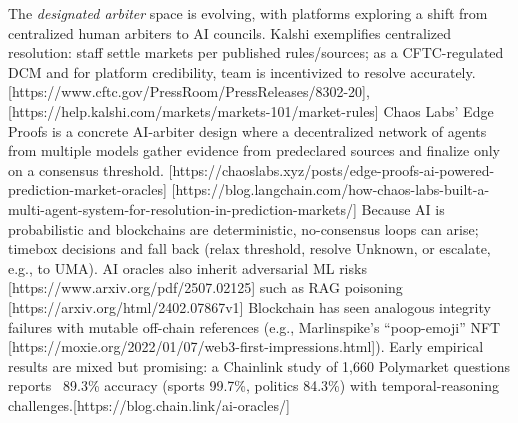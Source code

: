 

The \textit{designated arbiter} space is evolving, with platforms exploring a shift from centralized human arbiters to AI councils. Kalshi exemplifies centralized resolution: staff settle markets per published rules/sources; as a CFTC-regulated DCM and for platform credibility, team is incentivized to resolve accurately.[https://www.cftc.gov/PressRoom/PressReleases/8302-20], [https://help.kalshi.com/markets/markets-101/market-rules]
Chaos Labs’ Edge Proofs is a concrete AI-arbiter design where a decentralized network of agents from multiple models gather evidence from predeclared sources and finalize only on a consensus threshold. [https://chaoslabs.xyz/posts/edge-proofs-ai-powered-prediction-market-oracles] [https://blog.langchain.com/how-chaos-labs-built-a-multi-agent-system-for-resolution-in-prediction-markets/]
Because AI is probabilistic and blockchains are deterministic, no-consensus loops can arise; timebox decisions and fall back (relax threshold, resolve Unknown, or escalate, e.g., to UMA). AI oracles also inherit adversarial ML risks [https://www.arxiv.org/pdf/2507.02125] such as RAG poisoning [https://arxiv.org/html/2402.07867v1] Blockchain has seen analogous integrity failures with mutable off-chain references (e.g., Marlinspike’s “poop-emoji” NFT [https://moxie.org/2022/01/07/web3-first-impressions.html]).
Early empirical results are mixed but promising: a Chainlink study of 1,660 Polymarket questions reports ~89.3\% accuracy (sports 99.7\%, politics 84.3\%) with temporal-reasoning challenges.[https://blog.chain.link/ai-oracles/]





